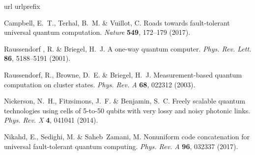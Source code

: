 \documentclass[
onecolumn,
superscriptaddress
]{revtex4-1}
\begin{document}
\providecommand{\noopsort}[1]{}\providecommand{\singleletter}[1]{#1}
\begin{thebibliography}{100}
\expandafter\ifx\csname url\endcsname\relax
  \def\url#1{\texttt{#1}}\fi
\expandafter\ifx\csname urlprefix\endcsname\relax\def\urlprefix{}\fi
\providecommand{\bibinfo}[2]{#2}
\providecommand{\eprint}[2][]{\url{#2}}

\bibinfo{author}{Campbell, E.~T.}, \bibinfo{author}{Terhal, B.~M.} \&
  \bibinfo{author}{Vuillot, C.}
\newblock \bibinfo{title}{Roads towards fault-tolerant universal quantum
  computation}.
\newblock \emph{\bibinfo{journal}{Nature}} \textbf{\bibinfo{volume}{549}},
  \bibinfo{pages}{172--179} (\bibinfo{year}{2017}).

\bibinfo{author}{Raussendorf{ }, R.} \& \bibinfo{author}{Briegel, H.~J.}
\newblock \bibinfo{title}{A one-way quantum computer}.
\newblock \emph{\bibinfo{journal}{Phys. Rev. Lett.}}
  \textbf{\bibinfo{volume}{86}}, \bibinfo{pages}{5188--5191}
  (\bibinfo{year}{2001}).

\bibinfo{author}{Raussendorf, R.}, \bibinfo{author}{Browne, D.~E.} \&
  \bibinfo{author}{Briegel, H.~J.}
\newblock \bibinfo{title}{Measurement-based quantum computation on cluster
  states}.
\newblock \emph{\bibinfo{journal}{Phys. Rev. A}} \textbf{\bibinfo{volume}{68}},
  \bibinfo{pages}{022312} (\bibinfo{year}{2003}).

\bibinfo{author}{Nickerson, N.~H.}, \bibinfo{author}{Fitzsimons, J.~F.} \&
  \bibinfo{author}{Benjamin, S.~C.}
\newblock \bibinfo{title}{Freely scalable quantum technologies using cells of
  5-to-50 qubits with very lossy and noisy photonic links}.
\newblock \emph{\bibinfo{journal}{Phys. Rev. X}} \textbf{\bibinfo{volume}{4}},
  \bibinfo{pages}{041041} (\bibinfo{year}{2014}).

\bibinfo{author}{Nikahd, E.}, \bibinfo{author}{Sedighi, M.} \&
  \bibinfo{author}{Saheb~Zamani, M.}
\newblock \bibinfo{title}{Nonuniform code concatenation for universal
  fault-tolerant quantum computing}.
\newblock \emph{\bibinfo{journal}{Phys. Rev. A}} \textbf{\bibinfo{volume}{96}},
  \bibinfo{pages}{032337} (\bibinfo{year}{2017}).


\end{thebibliography}
\end{document}
